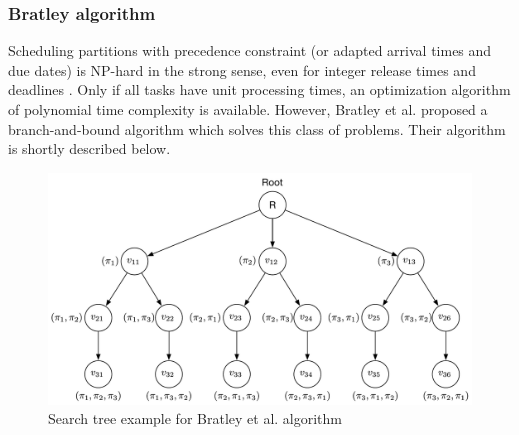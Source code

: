 \subsubsection{Bratley algorithm}
Scheduling partitions with precedence constraint (or adapted arrival times and due dates) is NP-hard in the strong sense, even for integer release times and deadlines \cite{LRKB77}. Only if all tasks have unit processing times, an optimization algorithm of polynomial time complexity is available. However, Bratley et al. \cite{bratleyScheduling} proposed a branch-and-bound algorithm which solves this class of problems. Their algorithm is shortly described below.
\begin{figure}[htbp] 
\centering    
\includegraphics[width=1.0\textwidth]{Bratley}
\caption{Search tree example for Bratley et al. algorithm}
\label{fig:bratley}
\end{figure}
